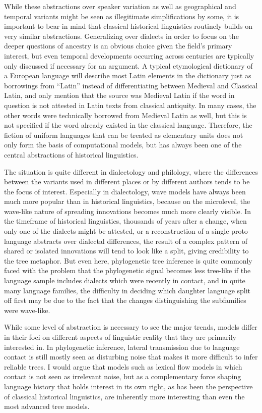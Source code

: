 While these abstractions over speaker variation as well as geographical and temporal variants might be seen as illegitimate simplifications by some, it is important to bear in mind that classical historical linguistics routinely builds on very similar abstractions. Generalizing over dialects in order to focus on the deeper questions of ancestry is an obvious choice given the field's primary interest, but even temporal developments occurring across centuries are typically only discussed if necessary for an argument. A typical etymological dictionary of a European language will describe most Latin elements in the dictionary just as borrowings from ``Latin'' instead of differentiating between Medieval and Classical Latin, and only mention that the source was Medieval Latin if the word in question is not attested in Latin texts from classical antiquity. In many cases, the other words were technically borrowed from Medieval Latin as well, but this is not specified if the word already existed in the classical language. Therefore, the fiction of uniform languages that can be treated as elementary units does not only form the basis of computational models, but has always been one of the central abstractions of historical linguistics.

The situation is quite different in dialectology and philology, where the differences between the variants used in different places or by different authors tends to be the focus of interest. Especially in dialectology, wave models have always been much more popular than in historical linguistics, because on the microlevel, the wave-like nature of spreading innovations becomes much more clearly visible. In the timeframe of historical linguistics, thousands of years after a change, when only one of the dialects might be attested, or a reconstruction of a single proto-language abstracts over dialectal differences, the result of a complex pattern of shared or isolated innovations will tend to look like a split, giving credibility to the tree metaphor. But even here, phylogenetic tree inference is quite commonly faced with the problem that the phylogenetic signal becomes less tree-like if the language sample includes dialects which were recently in contact, and in quite many language families, the difficulty in deciding which daughter language split off first may be due to the fact that the changes distinguishing the subfamilies were wave-like.

While some level of abstraction is necessary to see the major trends, models differ in their foci on different aspects of linguistic reality that they are primarily interested in. In phylogenetic inference, lateral transmission due to language contact is still mostly seen as disturbing noise that makes it more difficult to infer reliable trees. I would argue that models such as lexical flow models in which contact is not seen as irrelevant noise, but as a complementary force shaping language history that holds interest in its own right, as has been the perspective of classical historical linguistics, are inherently more interesting than even the most advanced tree models. 

